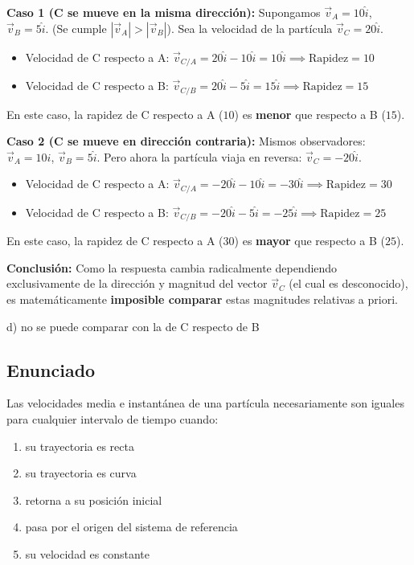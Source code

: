 \documentclass[12pt, a4paper]{article}
\begin{document}
\textbf{Caso 1 (C se mueve en la misma dirección):}
Supongamos $\vec{v}_A = 10\hat{i}$, $\vec{v}_B = 5\hat{i}$. (Se cumple $|\vec{v}_A| > |\vec{v}_B|$).
Sea la velocidad de la partícula $\vec{v}_C = 20\hat{i}$.
\begin{itemize}
    \item Velocidad de C respecto a A: $\vec{v}_{C/A} = 20\hat{i} - 10\hat{i} = 10\hat{i} \implies \text{Rapidez} = 10$
    \item Velocidad de C respecto a B: $\vec{v}_{C/B} = 20\hat{i} - 5\hat{i} = 15\hat{i} \implies \text{Rapidez} = 15$
\end{itemize}
En este caso, la rapidez de C respecto a A ($10$) es \textbf{menor} que respecto a B ($15$).

\textbf{Caso 2 (C se mueve en dirección contraria):}
Mismos observadores: $\vec{v}_A = 10\hat{i}$, $\vec{v}_B = 5\hat{i}$.
Pero ahora la partícula viaja en reversa: $\vec{v}_C = -20\hat{i}$.
\begin{itemize}
    \item Velocidad de C respecto a A: $\vec{v}_{C/A} = -20\hat{i} - 10\hat{i} = -30\hat{i} \implies \text{Rapidez} = 30$
    \item Velocidad de C respecto a B: $\vec{v}_{C/B} = -20\hat{i} - 5\hat{i} = -25\hat{i} \implies \text{Rapidez} = 25$
\end{itemize}
En este caso, la rapidez de C respecto a A ($30$) es \textbf{mayor} que respecto a B ($25$).

\textbf{Conclusión:} Como la respuesta cambia radicalmente dependiendo exclusivamente de la dirección y magnitud del vector $\vec{v}_C$ (el cual es desconocido), es matemáticamente \textbf{imposible comparar} estas magnitudes relativas a priori.

\begin{tcolorbox}[colback=green!5!white, colframe=green!50!black, title=Respuesta Final]
\centering \Large d) no se puede comparar con la de C respecto de B
\end{tcolorbox}

\newpage

\subsection*{Enunciado}
Las velocidades media e instantánea de una partícula necesariamente son iguales para cualquier intervalo de tiempo cuando:
\begin{enumerate}[label=\alph*)]
    \item su trayectoria es recta
    \item su trayectoria es curva
    \item retorna a su posición inicial
    \item pasa por el origen del sistema de referencia
    \item su velocidad es constante
\end{enumerate}
\end{document}
